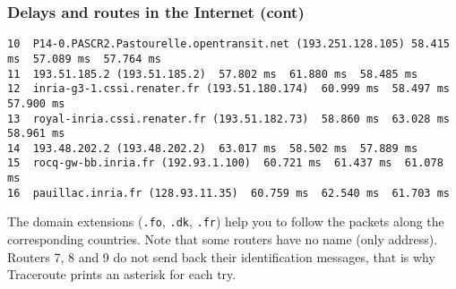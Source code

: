 %
\begin{frame}[containsverbatim]
\frametitle{Delays and routes in the Internet (cont)}

{\tiny
\begin{verbatim}
10  P14-0.PASCR2.Pastourelle.opentransit.net (193.251.128.105) 58.415 ms  57.089 ms  57.764 ms
11  193.51.185.2 (193.51.185.2)  57.802 ms  61.880 ms  58.485 ms
12  inria-g3-1.cssi.renater.fr (193.51.180.174)  60.999 ms  58.497 ms  57.900 ms
13  royal-inria.cssi.renater.fr (193.51.182.73)  58.860 ms  63.028 ms  58.961 ms
14  193.48.202.2 (193.48.202.2)  63.017 ms  58.502 ms  57.889 ms
15  rocq-gw-bb.inria.fr (192.93.1.100)  60.721 ms  61.437 ms  61.078 ms
16  pauillac.inria.fr (128.93.11.35)  60.759 ms  62.540 ms  61.703 ms
\end{verbatim}
}
The domain extensions (\texttt{.fo}, \texttt{.dk}, \texttt{.fr}) help
you to follow the packets along the corresponding countries. Note that
some routers have no name (only address). Routers 7, 8 and 9 do not
send back their identification messages, that is why
\textsf{Traceroute} prints an asterisk for each try.

\end{frame}
